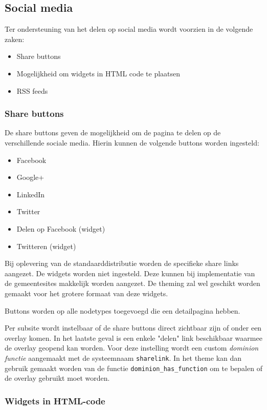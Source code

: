 \subsection{Social media}

Ter ondersteuning van het delen op social media wordt voorzien in de volgende zaken:
\begin{itemize}
\item Share buttons
\item Mogelijkheid om widgets in HTML code te plaatsen
\item RSS feeds
\end{itemize}

\subsubsection{Share buttons}

De share buttons geven de mogelijkheid om de pagina te delen op de verschillende sociale media. Hierin kunnen de volgende buttons worden ingesteld:
\begin{itemize}
\item Facebook
\item Google+
\item LinkedIn
\item Twitter
\item Delen op Facebook (widget)
\item Twitteren (widget)
\end{itemize}

Bij oplevering van de standaarddistributie worden de specifieke share links aangezet. De widgets worden niet ingesteld. Deze kunnen bij implementatie van de gemeentesites makkelijk worden aangezet. De theming zal wel geschikt worden gemaakt voor het grotere formaat van deze widgets.

Buttons worden op alle nodetypes toegevoegd die een detailpagina hebben.

Per subsite wordt instelbaar of de share buttons direct zichtbaar zijn of onder een overlay komen. In het laatste geval is een enkele "delen" link beschikbaar waarmee de overlay geopend kan worden. Voor deze instelling wordt een custom \emph{dominion functie} aangemaakt met de systeemnaam \texttt{sharelink}. In het theme kan dan gebruik gemaakt worden van de functie \texttt{dominion\_has\_function} om te bepalen of de overlay gebruikt moet worden.

\subsubsection{Widgets in HTML-code}


